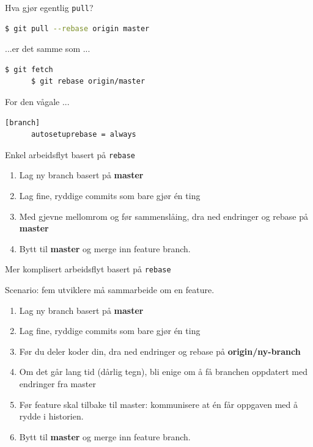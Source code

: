 \documentclass{beamer}
\begin{document}
\begin{frame}[fragile]{Hva gjør egentlig \texttt{pull}?}
    \begin{lstlisting}[language=bash]
      $ git pull --rebase origin master
    \end{lstlisting}
    \medskip
    ...er det samme som ...
    \medskip
    \begin{lstlisting}[language=bash]
      $ git fetch
      $ git rebase origin/master
    \end{lstlisting}
\end{frame}

\begin{frame}[fragile]{For den vågale ...}
    \begin{lstlisting}[language=bash, caption=\textasciitilde/.gitconfig]
    [branch]  
      autosetuprebase = always
    \end{lstlisting}
\end{frame}

\begin{frame}{Enkel arbeidsflyt basert på \texttt{rebase}}
    \begin{enumerate}
        \item<+-> Lag ny branch basert på \textbf{master}
        \item<+-> Lag fine, ryddige commits som bare gjør én ting
        \item<+-> Med gjevne mellomrom og før sammenslåing, dra ned endringer og rebase på \textbf{master}
        \item<+-> Bytt til \textbf{master} og merge inn feature branch.
    \end{enumerate}
\end{frame}

\begin{frame}{Mer komplisert arbeidsflyt basert på \texttt{rebase}}

    Scenario: fem utviklere må sammarbeide om en feature.

    \begin{enumerate}
        \item<+-> Lag ny branch basert på \textbf{master}
        \item<+-> Lag fine, ryddige commits som bare gjør én ting
        \item<+-> Før du deler koder din, dra ned endringer og rebase på \textbf{origin/ny-branch}
        \item<+-> Om det går lang tid (dårlig tegn), bli enige om å få branchen oppdatert med endringer fra master
        \item<+-> Før feature skal tilbake til master: kommunisere at én får oppgaven med å rydde i historien.
        \item<+-> Bytt til \textbf{master} og merge inn feature branch.
    \end{enumerate}
\end{frame}
\end{document}
